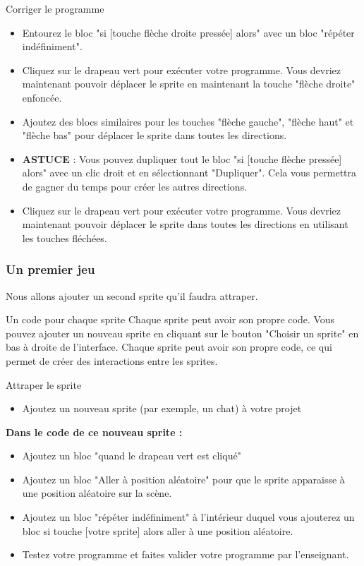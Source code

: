 \begin{UPSTIManipulation}{Corriger le programme}
\begin{itemize}[label=$\square$]
\item Entourez le bloc "si [touche flèche droite pressée] alors" avec un bloc "répéter indéfiniment".
\item Cliquez sur le drapeau vert pour exécuter votre programme. Vous devriez maintenant pouvoir déplacer le sprite en maintenant la touche "flèche droite" enfoncée.
\item Ajoutez des blocs similaires pour les touches "flèche gauche", "flèche haut" et "flèche bas" pour déplacer le sprite dans toutes les directions.
\item \textbf{ASTUCE} : Vous pouvez dupliquer tout le bloc "si [touche flèche pressée] alors" avec un clic droit et en sélectionnant "Dupliquer". Cela vous permettra de gagner du temps pour créer les autres directions.
\item Cliquez sur le drapeau vert pour exécuter votre programme. Vous devriez maintenant pouvoir déplacer le sprite dans toutes les directions en utilisant les touches fléchées.
\end{itemize}
\end{UPSTIManipulation}

\subsubsection{Un premier jeu}

Nous allons ajouter un second sprite qu'il faudra attraper. 

\begin{UPSTIinfor}{Un code pour chaque sprite}
Chaque sprite peut avoir son propre code. Vous pouvez ajouter un nouveau sprite en cliquant sur le bouton "Choisir un sprite" en bas à droite de l'interface. 
Chaque sprite peut avoir son propre code, ce qui permet de créer des interactions entre les sprites.
\end{UPSTIinfor}

\begin{UPSTIManipulation}{Attraper le sprite}
\begin{itemize}
\item Ajoutez un nouveau sprite (par exemple, un chat) à votre projet
\end{itemize}
\textbf{Dans le code de ce nouveau sprite :}
\begin{itemize}
\item Ajoutez un bloc "quand le drapeau vert est cliqué"
\item Ajoutez un bloc "Aller à position aléatoire" pour que le sprite apparaisse à une position aléatoire sur la scène.
\item Ajoutez un bloc "répéter indéfiniment" à l'intérieur duquel vous ajouterez un bloc si touche [votre sprite] alors aller à une position aléatoire.
\item Testez votre programme et faites valider votre programme par l'enseignant.
\end{itemize}
\end{UPSTIManipulation}